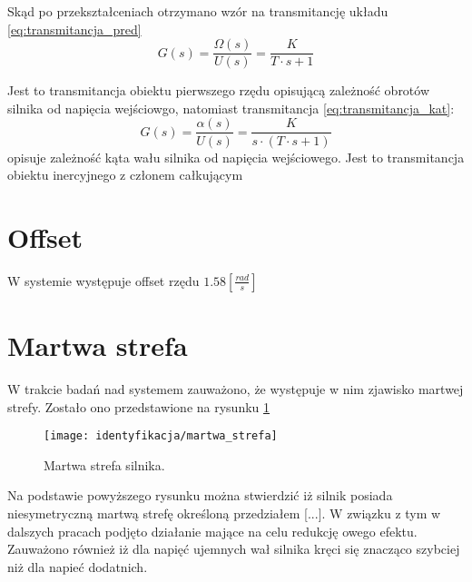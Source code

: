 Skąd po przekształceniach otrzymano wzór na transmitancję układu \ref{eq:transmitancja_pred}
\begin{equation}
\label{eq:transmitancja_pred}
G(s) = \frac{\Omega(s)}{U(s)} = \frac{K}{T \cdot s + 1}
\end{equation}

Jest to transmitancja obiektu pierwszego rzędu opisującą zależność obrotów silnika od napięcia wejściowgo, natomiast transmitancja \ref{eq:transmitancja_kat}:
\begin{equation}
\label{eq:transmitancja_kat}
G(s) = \frac{\alpha(s)}{U(s)} = \frac{ K}{s \cdot (T \cdot s + 1)}
\end{equation}
opisuje zależność kąta wału silnika od napięcia wejściowego. Jest to transmitancja obiektu inercyjnego z członem całkującym
\section{Offset}
W systemie występuje offset rzędu $1.58 [\frac{rad}{s}]$
\section{Martwa strefa}
W trakcie badań nad systemem zauważono, że występuje w nim zjawisko martwej strefy. Zostało ono przedstawione na rysunku \ref{fig:martwa_sterfa}
\begin{figure}[H]
	
	\texttt{[image: identyfikacja/martwa\_strefa]}
	\centering
	\caption{Martwa strefa silnika.}
	\label{fig:martwa_sterfa}
\end{figure}

Na podstawie powyższego rysunku można stwierdzić iż silnik posiada niesymetryczną martwą strefę określoną przedziałem [...]. W związku z tym w dalszych pracach podjęto działanie mające na celu redukcję owego efektu. Zauważono również iż dla napięć ujemnych wał silnika kręci się znacząco szybciej niż dla napieć dodatnich.
